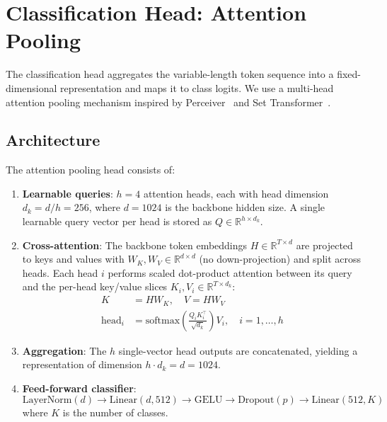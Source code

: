 \section{Classification Head: Attention Pooling}
\label{sec:method-head}

The classification head aggregates the variable-length token sequence into a fixed-dimensional representation and maps it to class logits. We use a multi-head attention pooling mechanism inspired by Perceiver~\cite{Jaegle2021} and Set Transformer~\cite{Lee2019}.

\subsection{Architecture}

The attention pooling head consists of:

\begin{enumerate}
    \item \textbf{Learnable queries}: $h = 4$ attention heads, each with head dimension $d_k = d / h = 256$, where $d = 1024$ is the backbone hidden size. A single learnable query vector per head is stored as $Q \in \mathbb{R}^{h \times d_k}$.

    \item \textbf{Cross-attention}: The backbone token embeddings $H \in \mathbb{R}^{T \times d}$ are projected to keys and values with $W_K, W_V \in \mathbb{R}^{d \times d}$ (no down-projection) and split across heads. Each head $i$ performs scaled dot-product attention between its query and the per-head key/value slices $K_i, V_i \in \mathbb{R}^{T \times d_k}$:
    \begin{align}
        K &= H W_K, \quad V = H W_V \\
        \text{head}_i &= \text{softmax}\!\left(\frac{Q_i K_i^\top}{\sqrt{d_k}}\right) V_i, \quad i = 1, \ldots, h
    \end{align}

    \item \textbf{Aggregation}: The $h$ single-vector head outputs are concatenated, yielding a representation of dimension $h \cdot d_k = d = 1024$.

    \item \textbf{Feed-forward classifier}:
    \begin{equation}
        \text{LayerNorm}(d) \to \text{Linear}(d, 512) \to \text{GELU} \to \text{Dropout}(p) \to \text{Linear}(512, K)
    \end{equation}
    where $K$ is the number of classes.
\end{enumerate}

